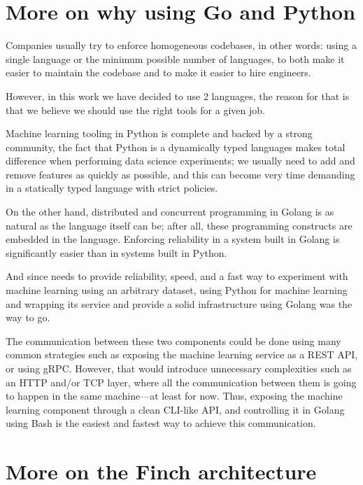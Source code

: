 \begin{appendices}
\section{More on why using Go and Python}
Companies usually try to enforce homogeneous codebases, in other words: using a single language or the minimum possible number of languages, to both make it easier to maintain the codebase and to make it easier to hire engineers.

However, in this work we have decided to use 2 languages, the reason for that is that we believe we should use the right tools for a given job.

Machine learning tooling in Python is complete and backed by a strong community, the fact that Python is a dynamically typed languages makes total difference when performing data science experiments; we usually need to add and remove features as quickly as possible, and this can become very time demanding in a statically typed language with strict policies.

On the other hand, distributed and concurrent programming in Golang is as natural as the language itself can be; after all, these programming constructs are embedded in the language. Enforcing reliability in a system built in Golang is significantly easier than in systems built in Python.

And since \projectname{} needs to provide reliability, speed, and a fast way to experiment with machine learning using an arbitrary dataset, using Python for machine learning and wrapping its service and provide a solid infrastructure using Golang was the way to go.

The communication between these two components could be done using many common strategies such as exposing the machine learning service as a REST API, or using gRPC. However, that would introduce unnecessary complexities such as an HTTP and/or TCP layer, where all the communication between them is going to happen in the same machine---at least for now. Thus, exposing the machine learning component through a clean CLI-like API, and controlling it in Golang using Bash is the easiest and fastest way to achieve this communication.


\section{More on the Finch architecture}


\end{appendices}
